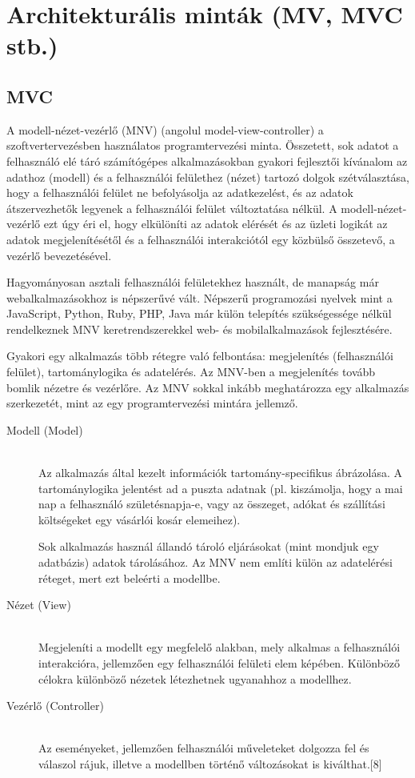 \documentclass[margin=0px]{article}
\begin{document}
\section{Architekturális minták (MV, MVC stb.)}

\subsection{MVC}
A modell-nézet-vezérlő (MNV) (angolul model-view-controller) a szoftvertervezésben használatos programtervezési minta. Összetett, sok adatot a felhasználó elé táró számítógépes alkalmazásokban gyakori fejlesztői kívánalom az adathoz (modell) és a felhasználói felülethez (nézet) tartozó dolgok szétválasztása, hogy a felhasználói felület ne befolyásolja az adatkezelést, és az adatok átszervezhetők legyenek a felhasználói felület változtatása nélkül. A modell-nézet-vezérlő ezt úgy éri el, hogy elkülöníti az adatok elérését és az üzleti logikát az adatok megjelenítésétől és a felhasználói interakciótól egy közbülső összetevő, a vezérlő bevezetésével.

Hagyományosan asztali felhasználói felületekhez használt, de manapság már webalkalmazásokhoz is népszerűvé vált. Népszerű programozási nyelvek mint a JavaScript, Python, Ruby, PHP, Java már külön telepítés szükségessége nélkül rendelkeznek MNV keretrendszerekkel web- és mobilalkalmazások fejlesztésére.

Gyakori egy alkalmazás több rétegre való felbontása: megjelenítés (felhasználói felület), tartománylogika és adatelérés. Az MNV-ben a megjelenítés tovább bomlik nézetre és vezérlőre. Az MNV sokkal inkább meghatározza egy alkalmazás szerkezetét, mint az egy programtervezési mintára jellemző.
\begin{description}
    \item[Modell (Model)] \hfill \\
        Az alkalmazás által kezelt információk tartomány-specifikus ábrázolása. A tartománylogika jelentést ad a puszta adatnak (pl. kiszámolja, hogy a mai nap a felhasználó születésnapja-e, vagy az összeget, adókat és szállítási költségeket egy vásárlói kosár elemeihez).

        Sok alkalmazás használ állandó tároló eljárásokat (mint mondjuk egy adatbázis) adatok tárolásához. Az MNV nem említi külön az adatelérési réteget, mert ezt beleérti a modellbe.
    \item[Nézet (View)] \hfill \\
        Megjeleníti a modellt egy megfelelő alakban, mely alkalmas a felhasználói interakcióra, jellemzően egy felhasználói felületi elem képében. Különböző célokra különböző nézetek létezhetnek ugyanahhoz a modellhez.
    \item[Vezérlő (Controller)] \hfill \\
        Az eseményeket, jellemzően felhasználói műveleteket dolgozza fel és válaszol rájuk, illetve a modellben történő változásokat is kiválthat.[8]
\end{description}
\end{document}
